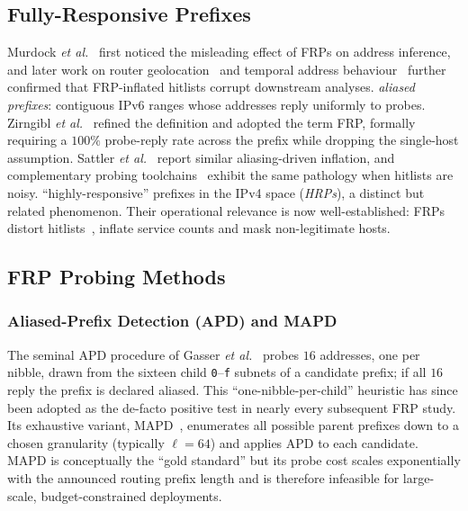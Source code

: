 \documentclass[conference]{IEEEtran}
\begin{document}
\subsection{Fully-Responsive Prefixes}
Murdock \emph{et al.}~\cite{murdock2017tga} first noticed
the misleading effect of FRPs on address inference, and later
work on router geolocation~\cite{gharaibeh2017look} and
temporal address behaviour~\cite{plonka2015temporal} further
confirmed that FRP-inflated hitlists corrupt downstream analyses.
\emph{aliased prefixes}: contiguous IPv6 ranges whose addresses reply
uniformly to probes.  Zirngibl \emph{et
al.}~\cite{zirngibl2022rusty} refined the definition and adopted the
term FRP, formally requiring a $100\%$ probe-reply rate across the
prefix while dropping the single-host assumption.  Sattler
\emph{et al.}~\cite{sattler2023hrp} report similar
aliasing-driven inflation, and complementary probing
toolchains~\cite{vermeulen2020multilevel,vermeulen2020diamond,li2022fast6}
exhibit the same pathology when hitlists are noisy.
``highly-responsive'' prefixes in the IPv4 space (\emph{HRPs}), a
distinct but related phenomenon.  Their operational relevance is now
well-established: FRPs distort
hitlists~\cite{gasser2018clusters,steger2023tga}, inflate service
counts and mask non-legitimate hosts.

\subsection{FRP Probing Methods}
\label{sec:bg:probing}
\subsubsection{Aliased-Prefix Detection (APD) and MAPD}
The seminal APD procedure of Gasser
\emph{et al.}~\cite{gasser2018clusters} probes $16$ addresses,
one per nibble, drawn from the sixteen child \texttt{0}--\texttt{f}
subnets of a candidate prefix; if all $16$ reply the prefix is
declared aliased.  This ``one-nibble-per-child'' heuristic has since
been adopted as the de-facto positive test in nearly every
subsequent FRP study.  Its exhaustive variant,
MAPD~\cite{gasser2018clusters,zirngibl2022rusty}, enumerates all
possible parent prefixes down to a chosen granularity (typically
$\ell{=}64$) and applies APD to each candidate.  MAPD is
conceptually the ``gold standard'' but its probe cost scales
exponentially with the announced routing prefix length and is
therefore infeasible for large-scale, budget-constrained deployments.
\end{document}
